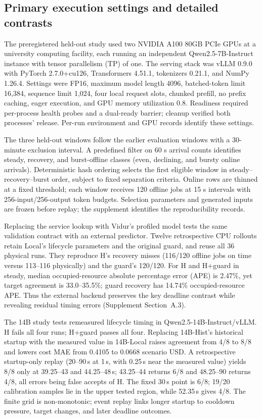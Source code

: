 \subsection{Primary execution settings and detailed contrasts}
The preregistered held-out study used two NVIDIA A100
80GB PCIe GPUs at a university computing facility, each running an independent
Qwen2.5-7B-Instruct instance with tensor parallelism (TP) of one. The serving stack
was vLLM 0.9.0 \citep{kwon2023vllm} with PyTorch 2.7.0+cu126, Transformers 4.51.1, tokenizers 0.21.1,
and NumPy 1.26.4. Settings were FP16, maximum model length 4096, batched-token
limit 16,384, sequence limit 1,024, four local request slots, chunked prefill,
no prefix caching, eager execution, and GPU memory utilization 0.8. Readiness
required per-process health probes and a dual-ready barrier; cleanup verified
both processes' release. Per-run environment and GPU records identify these settings.

The three held-out windows follow the earlier evaluation windows with a
30-minute exclusion interval. A predefined filter on 60 s arrival counts
identifies steady, recovery, and burst-offline classes (even, declining, and
bursty online arrivals). Deterministic hash ordering selects the first eligible
window in steady--recovery--burst order, subject to fixed separation criteria.
Online rows are thinned at a fixed threshold; each window receives 120 offline
jobs at 15 s intervals with 256-input/256-output token budgets. Selection
parameters and generated inputs are frozen before replay; the supplement
identifies the reproducibility records.


Replacing the service lookup with Vidur's profiled model tests the same
validation contract with an external predictor. Twelve retrospective CPU
rollouts retain Local's lifecycle parameters and the original guard, and reuse
all 36 physical runs. They reproduce H's recovery misses (116/120 offline
jobs on time versus 113--116 physically) and the guard's 120/120.
For H and H+guard in steady, median occupied-resource absolute percentage error (APE) is
2.47\%, yet target agreement is 33.0--35.5\%; guard recovery has 14.74\%
occupied-resource APE. Thus the external backend preserves the key deadline
contrast while revealing residual timing errors (Supplement Section~A.3).


The 14B study tests remeasured lifecycle timing in Qwen2.5-14B-Instruct/vLLM.
H fails all four runs; H+guard passes all four. Replacing 14B-Hist's historical
startup with the measured value in 14B-Local raises agreement from 4/8 to 8/8
and lowers cost MAE from 0.4105 to 0.0668 scenario USD. A retrospective
startup-only replay (20--90\,s at 1\,s, with 0.25\,s near the measured value)
yields 8/8 only at 39.25--43 and 44.25--48\,s; 43.25--44 returns 6/8 and
48.25--90 returns 4/8, all errors being false accepts of H. The fixed 30\,s
point is 6/8; 19/20 calibration samples lie in the upper tested region, while
52.35\,s gives 4/8. The finite grid is non-monotonic; event replay links
longer startup to cooldown pressure, target changes, and later deadline outcomes.


